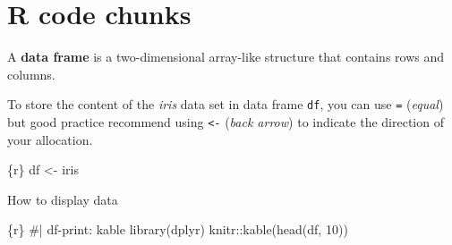 \documentclass[
  letterpaper,
  DIV=11,
  numbers=noendperiod]{scrreprt}
\newenvironment{Shaded}{\begin{snugshade}}{\end{snugshade}}
\newcommand{\CommentTok}[1]{\textcolor[rgb]{0.37,0.37,0.37}{#1}}
\newcommand{\DecValTok}[1]{\textcolor[rgb]{0.68,0.00,0.00}{#1}}
\newcommand{\FunctionTok}[1]{\textcolor[rgb]{0.28,0.35,0.67}{#1}}
\newcommand{\InformationTok}[1]{\textcolor[rgb]{0.37,0.37,0.37}{#1}}
\newcommand{\NormalTok}[1]{\textcolor[rgb]{0.00,0.23,0.31}{#1}}
\newcommand{\OtherTok}[1]{\textcolor[rgb]{0.00,0.23,0.31}{#1}}
\newcommand{\SpecialCharTok}[1]{\textcolor[rgb]{0.37,0.37,0.37}{#1}}
\begin{document}
\hypertarget{r-code-chunks}{%
\section{R code chunks}\label{r-code-chunks}}

\begin{tcolorbox}[enhanced jigsaw, colframe=quarto-callout-note-color-frame, colback=white, rightrule=.15mm, bottomrule=.15mm, left=2mm, arc=.35mm, coltitle=black, title=\textcolor{quarto-callout-note-color}{\faInfo}\hspace{0.5em}{Note}, opacitybacktitle=0.6, bottomtitle=1mm, opacityback=0, toptitle=1mm, toprule=.15mm, colbacktitle=quarto-callout-note-color!10!white, titlerule=0mm, leftrule=.75mm, breakable]
A \textbf{data frame} is a two-dimensional array-like structure that
contains rows and columns.
\end{tcolorbox}

To store the content of the \emph{iris} data set in data frame
\texttt{df}, you can use \texttt{=} (\emph{equal}) but good practice
recommend using \texttt{\textless{}-} (\emph{back arrow}) to indicate
the direction of your allocation.

\begin{Shaded}
\begin{Highlighting}[]
\InformationTok{\textasciigrave{}\textasciigrave{}\textasciigrave{}\{r\}}
\NormalTok{df }\OtherTok{\textless{}{-}}\NormalTok{ iris}
\InformationTok{\textasciigrave{}\textasciigrave{}\textasciigrave{}}
\end{Highlighting}
\end{Shaded}

How to display data

\begin{Shaded}
\begin{Highlighting}[]
\InformationTok{\textasciigrave{}\textasciigrave{}\textasciigrave{}\{r\}}
\CommentTok{\#| df{-}print: kable}
\FunctionTok{library}\NormalTok{(dplyr)}
\NormalTok{knitr}\SpecialCharTok{::}\FunctionTok{kable}\NormalTok{(}\FunctionTok{head}\NormalTok{(df, }\DecValTok{10}\NormalTok{))}
\InformationTok{\textasciigrave{}\textasciigrave{}\textasciigrave{}}
\end{Highlighting}
\end{Shaded}
\end{document}

